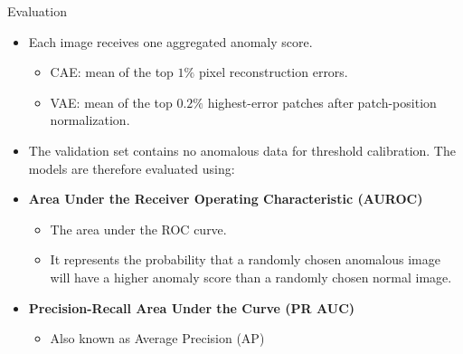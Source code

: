 \documentclass{beamer}
\begin{document}
\begin{frame}{Evaluation}
    \begin{itemize}
        \item Each image receives one aggregated anomaly score.
        \begin{itemize}
            \item CAE: mean of the top $1\%$ pixel reconstruction errors.
            \item VAE: mean of the top $0.2\%$ highest-error patches after patch-position normalization.
        \end{itemize}
        \vspace{0.15cm}
        \item The validation set contains no anomalous data for threshold calibration. The models are therefore evaluated using:
        \item \textbf{Area Under the Receiver Operating Characteristic (AUROC)} \begin{itemize}
            \item The area under the ROC curve.
            \item It represents the probability that a randomly chosen anomalous image will have a higher anomaly score than a randomly chosen normal image.
        \end{itemize}
        \item \textbf{Precision-Recall Area Under the Curve (PR AUC)}\begin{itemize}
            \item Also known as Average Precision (AP)
        \end{itemize}
    \end{itemize}
\end{frame}
\end{document}
